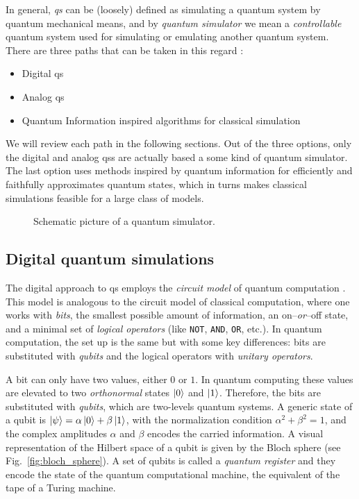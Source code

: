 In general, \emph{\acf{qs}} can be (loosely) defined as simulating a quantum system by quantum mechanical means, and by \emph{quantum simulator} we mean a \emph{controllable} quantum system used for simulating or emulating another quantum system.
There are three paths that can be taken in this regard \cite{georgescu2014simulation}:
\begin{itemize}
    \item Digital \acl{qs}
    \item Analog \acl{qs}
    \item Quantum Information inspired algorithms for classical simulation
\end{itemize}
We will review each path in the following sections.
Out of the three options, only the digital and analog \acp{qs} are actually based a some kind of quantum simulator.
The last option uses methods inspired by quantum information for efficiently and faithfully approximates quantum states, which in turns makes classical simulations feasible for a large class of models.


\begin{figure}[t]
    \centering
    
    \caption{Schematic picture of a quantum simulator.}
\end{figure}


%
%
\subsection{Digital quantum simulations}
\label{sub:digital_quantum_simulations}

The digital approach to \ac{qs} employs the \emph{circuit model} of quantum computation \cite{nielsen2010quantum, deutsch1989quantum}.
This model is analogous to the circuit model of classical computation, where one works with \emph{bits}, the smallest possible amount of information, an on--\emph{or}--off state, and a minimal set of \emph{logical operators} (like \texttt{NOT}, \texttt{AND}, \texttt{OR}, etc.).
In quantum computation, the set up is the same but with some key differences:
bits are substituted with \emph{qubits} and the logical operators with \emph{unitary operators}.

A bit can only have two values, either $0$ or $1$.
In quantum computing these values are elevated to two \emph{orthonormal} states $\ket{0}$ and $\ket{1}$.
Therefore, the bits are substituted with \emph{qubits}, which are two-levels quantum systems.
A generic state of a qubit is $\ket{\psi} = \alpha \ket{0} + \beta \ket{1}$, with the normalization condition $\alpha^2 + \beta^2 = 1$, and the complex amplitudes $\alpha$ and $\beta$ encodes the carried information.
A visual representation of the Hilbert space of a qubit is given by the Bloch sphere (see Fig.~\ref{fig:bloch_sphere}).
A set of qubits is called a \emph{quantum register} and they encode the state of the quantum computational machine, the equivalent of the tape of a Turing machine.


